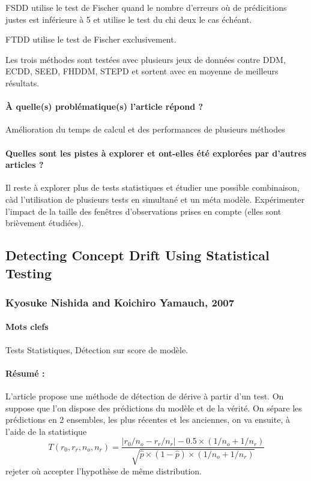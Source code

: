 \documentclass[11pt,a4paper]{report}
\begin{document}
FSDD utilise le test de Fischer quand le nombre d'erreurs où de prédicitions justes est inférieure à 5 et utilise le test du chi deux le cas échéant.

FTDD utilise le test de Fischer exclusivement.

Les trois méthodes sont testées avec plusieurs jeux de données contre DDM, ECDD, SEED, FHDDM, STEPD et sortent avec en moyenne de meilleurs résultats.
\paragraph{À quelle(s) problématique(s) l'article répond ?} Amélioration du temps de calcul et des performances de plusieurs méthodes

\paragraph{Quelles sont les pistes à explorer et ont-elles été explorées par d'autres articles ?} Il reste à explorer plus de tests statistiques et étudier une possible combinaison, càd l'utilisation de plusieurs tests en simultané et un méta modèle. Expérimenter l'impact de la taille des fenêtres d'observations prises en compte (elles sont brièvement étudiées).



\subsection{Detecting Concept Drift Using Statistical Testing}
\subsubsection{Kyosuke Nishida and Koichiro Yamauch, 2007}

\paragraph{Mots clefs} Tests Statistiques, Détection sur score de modèle.

\paragraph{Résumé :} L'article propose une méthode de détection de dérive à partir d'un test. On suppose que l'on dispose des prédictions du modèle et de la vérité. On sépare les prédictions en 2 ensembles, les plus récentes et les anciennes, on va ensuite, à l'aide de la statistique $$T\left(r_{0}, r_{r}, n_{o}, n_{r}\right)=\frac{\left|r_{0} / n_{o}-r_{r} / n_{r}\right|-0.5 \times\left(1 / n_{o}+1 / n_{r}\right)}{\sqrt{\hat{p} \times(1-\hat{p}) \times\left(1 / n_{o}+1 / n_{r}\right)}}$$ rejeter où accepter l'hypothèse de même distribution. 
\end{document}
